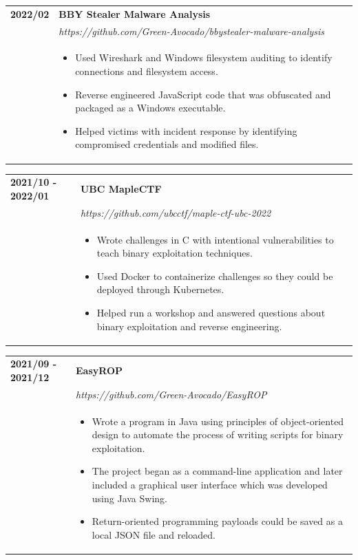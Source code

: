 \documentclass[letterpaper]{article}
\begin{document}
        \begin{tabular}{p{} p{}}
            \textbf{2022/02} & \textbf{BBY Stealer Malware Analysis} \\
            & \emph{https://github.com/Green-Avocado/bbystealer-malware-analysis} \\
            & \begin{itemize}
                \item Used Wireshark and Windows filesystem auditing to identify connections and
                    filesystem access.
                \item Reverse engineered JavaScript code that was obfuscated and packaged as a Windows
                    executable.
                \item Helped victims with incident response by identifying compromised credentials and
                    modified files.
            \end{itemize}
        \end{tabular}

        \begin{tabular}{p{} p{}}
            \textbf{2021/10 - 2022/01} & \textbf{UBC MapleCTF} \\
            & \emph{https://github.com/ubcctf/maple-ctf-ubc-2022} \\
            & \begin{itemize}
                \item Wrote challenges in C with intentional vulnerabilities to teach binary exploitation
                    techniques.
                \item Used Docker to containerize challenges so they could be deployed through Kubernetes.
                \item Helped run a workshop and answered questions about binary exploitation and reverse
                    engineering.
            \end{itemize}
        \end{tabular}

        \begin{tabular}{p{} p{}}
            \textbf{2021/09 - 2021/12} & \textbf{EasyROP} \\
            & \emph{https://github.com/Green-Avocado/EasyROP} \\
            & \begin{itemize}
                \item Wrote a program in Java using principles of object-oriented design to automate
                    the process of writing scripts for binary exploitation.
                \item The project began as a command-line application and later included a graphical user
                    interface which was developed using Java Swing.
                \item Return-oriented programming payloads could be saved as a local JSON file and
                    reloaded.
            \end{itemize}
        \end{tabular}
\end{document}
